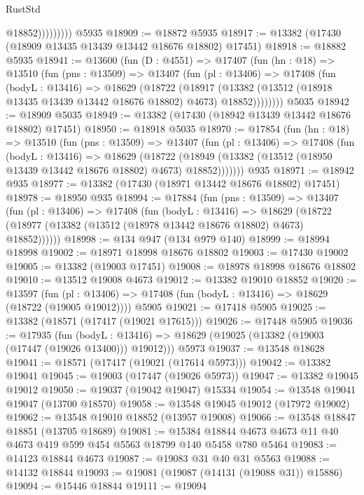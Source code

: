 \begin{lexlean}{RustStd}
\begin{coremodule}
                      @18852)))))))))
    @5935
@18909 := @18872 @5935
@18917 := @13382 (@17430 (@18909 @13435 @13439 @13442 @18676 @18802) @17451)
@18918 := @18882 @5935
@18941 := @13600
    (fun (D : @4551) =>
    @17407
      (fun (hn : @18) =>
      @13510
        (fun (pns : @13509) =>
        @13407
          (fun (pl : @13406) =>
          @17408
            (fun (bodyL : @13416) =>
            @18629
              (@18722
                (@18917
                  (@13382 (@13512 (@18918 @13435 @13439 @13442 @18676 @18802) @4673) @18852))))))))
    @5035
@18942 := @18909 @5035
@18949 := @13382 (@17430 (@18942 @13439 @13442 @18676 @18802) @17451)
@18950 := @18918 @5035
@18970 := @17854
    (fun (hn : @18) =>
    @13510
      (fun (pns : @13509) =>
      @13407
        (fun (pl : @13406) =>
        @17408
          (fun (bodyL : @13416) =>
          @18629
            (@18722
              (@18949 (@13382 (@13512 (@18950 @13439 @13442 @18676 @18802) @4673) @18852)))))))
    @935
@18971 := @18942 @935
@18977 := @13382 (@17430 (@18971 @13442 @18676 @18802) @17451)
@18978 := @18950 @935
@18994 := @17884
    (fun (pns : @13509) =>
    @13407
      (fun (pl : @13406) =>
      @17408
        (fun (bodyL : @13416) =>
        @18629 (@18722 (@18977 (@13382 (@13512 (@18978 @13442 @18676 @18802) @4673) @18852))))))
@18998 := @134 @947 (@134 @979 @140)
@18999 := @18994 @18998
@19002 := @18971 @18998 @18676 @18802
@19003 := @17430 @19002
@19005 := @13382 (@19003 @17451)
@19008 := @18978 @18998 @18676 @18802
@19010 := @13512 @19008 @4673
@19012 := @13382 @19010 @18852
@19020 := @13597
    (fun (pl : @13406) => @17408 (fun (bodyL : @13416) => @18629 (@18722 (@19005 @19012))))
    @5905
@19021 := @17418 @5905
@19025 := @13382 (@18571 (@17417 (@19021 @17615)))
@19026 := @17448 @5905
@19036 := @17935
    (fun (bodyL : @13416) => @18629 (@19025 (@13382 (@19003 (@17447 (@19026 @13400))) @19012)))
    @5973
@19037 := @13548 @18628
@19041 := @18571 (@17417 (@19021 (@17614 @5973)))
@19042 := @13382 @19041
@19045 := @19003 (@17447 (@19026 @5973))
@19047 := @13382 @19045 @19012
@19050 := @19037 (@19042 @19047) @15334
@19054 := @13548 @19041 @19047 (@13700 @18570)
@19058 := @13548 @19045 @19012 (@17972 @19002)
@19062 := @13548 @19010 @18852 (@13957 @19008)
@19066 := @13548 @18847 @18851 (@13705 @18689)
@19081 := @15384 @18844 @4673 @4673 @11 @40 @4673 @419 @599 @454 @5563 @18799 @140 @5458 @780 @5464
@19083 := @14123 @18844 @4673
@19087 := @19083 @31 @40 @31 @5563
@19088 := @14132 @18844
@19093 := @19081 (@19087 (@14131 (@19088 @31)) @15886)
@19094 := @15446 @18844
@19111 := @19094

\end{coremodule}
\end{lexlean}

